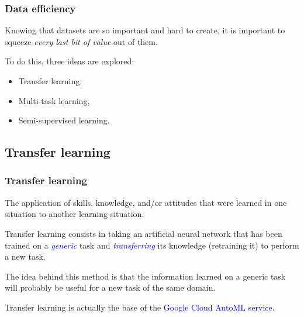 \documentclass[10pt]{beamer}
\begin{document}
\begin{frame}
  \frametitle{Data efficiency}

  Knowing that datasets are so important and hard to create, it is
  important to squeeze \emph{every last bit of value} out of them.

  \bigskip

  To do this, three ideas are explored:

  \begin{itemize}
    \item Transfer learning,
    \item Multi-task learning,
    \item Semi-supervised learning.
  \end{itemize}

\end{frame}

\subsection{Transfer learning}

\begin{frame}

  \frametitle{Transfer learning}

  \begin{displayquote}[Perkins, 1992]
  The application of skills, knowledge, and/or attitudes that were
  learned in one situation to another learning situation.
  \end{displayquote}

  \bigskip

  Transfer learning consists in taking an artificial neural network
  that has been trained on a \textcolor{blue}{\emph{generic}} task and
  \textcolor{blue}{\emph{transferring}} its knowledge (retraining it)
  to perform a new task.

  \bigskip

  The idea behind this method is that the information learned on a
  generic task will probably be useful for a new task of the same
  domain.

  \bigskip

  Transfer learning is actually the base of the
  \textcolor{blue}{Google Cloud AutoML service}.

\end{frame}
\end{document}

